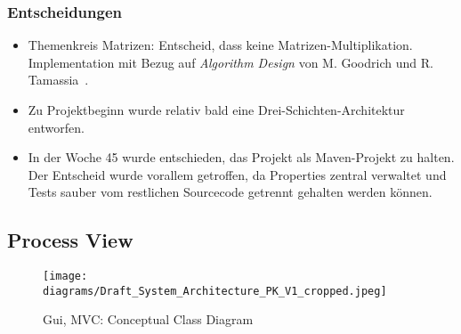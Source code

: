 \subsubsection{Entscheidungen}
% 
\begin{itemize}
  \item Themenkreis Matrizen: Entscheid, dass keine Matrizen-Multiplikation. Implementation mit Bezug auf \textit{Algorithm Design} von M. Goodrich und R. Tamassia~\cite{goodrichtamassia:2002}.
  \item Zu Projektbeginn wurde relativ bald eine Drei-Schichten-Architektur entworfen.
  \item In der Woche 45 wurde entschieden, das Projekt als Maven-Projekt zu halten. Der Entscheid wurde vorallem getroffen, da Properties zentral verwaltet und Tests sauber vom restlichen Sourcecode getrennt gehalten werden k\"onnen.
\end{itemize}
% 
% 
% 
% 
% 
\subsection{Process View}
% 
\begin{figure}[H]
    \centering
    \texttt{[image: diagrams/Draft\_System\_Architecture\_PK\_V1\_cropped.jpeg]}
    \caption{Gui, MVC: Conceptual Class Diagram}
    \label{fig:gui-mvc-ccd}
\end{figure}
% 
